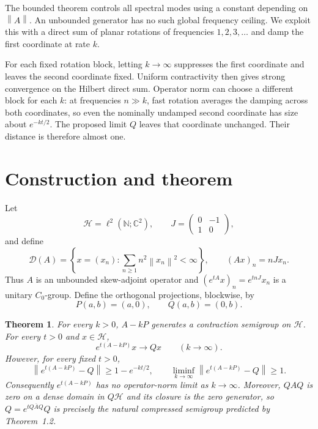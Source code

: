 \documentclass[11pt]{article}
\newtheorem{theorem}{Theorem}
\newcommand{\Hh}{\mathcal H}
\newcommand{\D}{\mathcal D}
\newcommand{\opnorm}[1]{\left\lVert #1\right\rVert}
\begin{document}
The bounded theorem controls all spectral modes using a constant depending on
$\opnorm{A}$. An unbounded generator has no such global frequency ceiling.
We exploit this with a direct sum of planar rotations of frequencies
$1,2,3,\ldots$ and damp the first coordinate at rate $k$.

For each fixed rotation block, letting $k\to\infty$ suppresses the first
coordinate and leaves the second coordinate fixed. Uniform contractivity then
gives strong convergence on the Hilbert direct sum. Operator norm can choose a
different block for each $k$: at frequencies $n\gg k$, fast rotation averages
the damping across both coordinates, so even the nominally undamped second
coordinate has size about $e^{-kt/2}$. The proposed limit $Q$ leaves that
coordinate unchanged. Their distance is therefore almost one.

\section{Construction and theorem}

Let
\[
 \Hh=\ell^2(\mathbb N;\mathbb C^2),\qquad
 J=\begin{pmatrix}0&-1\\1&0\end{pmatrix},
\]
and define
\[
 \D(A)=\left\{x=(x_n):\sum_{n\ge1}n^2\opnorm{x_n}^2<\infty\right\},
 \qquad (Ax)_n=nJx_n.
\]
Thus $A$ is an unbounded skew-adjoint operator and
$(e^{tA}x)_n=e^{tnJ}x_n$ is a unitary $C_0$-group. Define the orthogonal
projections, blockwise, by
\[
 P(a,b)=(a,0),\qquad Q(a,b)=(0,b).
\]

\begin{theorem}\label{thm:main}
For every $k>0$, $A-kP$ generates a contraction semigroup on $\Hh$. For every
$t>0$ and $x\in\Hh$,
\[
                   e^{t(A-kP)}x\longrightarrow Qx
                   \qquad(k\to\infty).
\]
However, for every fixed $t>0$,
\begin{equation}\label{eq:lower}
 \opnorm{e^{t(A-kP)}-Q}\ge 1-e^{-kt/2},
 \qquad
 \liminf_{k\to\infty}\opnorm{e^{t(A-kP)}-Q}\ge1.
\end{equation}
Consequently $e^{t(A-kP)}$ has no operator-norm limit as $k\to\infty$.
Moreover, $QAQ$ is zero on a dense domain in $Q\Hh$ and its closure is the
zero generator, so $Q=e^{t\overline{QAQ}}Q$ is precisely the natural compressed
semigroup predicted by Theorem~1.2.
\end{theorem}
\end{document}
